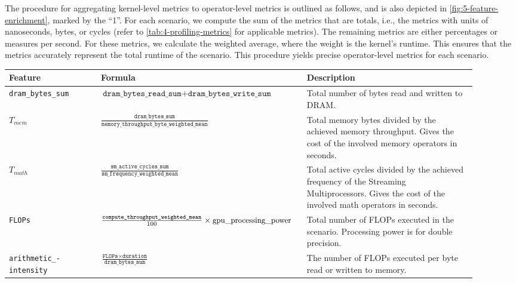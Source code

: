 The procedure for aggregating kernel-level metrics to operator-level metrics is outlined as follows, and is also depicted in \autoref{fig:5-feature-enrichment}, marked by the “1”. For each scenario, we compute the sum of the metrics that are totals, i.e., the metrics with units of nanoseconds, bytes, or cycles (refer to \autoref{tab:4-profiling-metrics} for applicable metrics). The remaining metrics are either percentages or measures per second. For these metrics, we calculate the weighted average, where the weight is the kernel’s runtime. This ensures that the metrics accurately represent the total runtime of the scenario. This procedure yields precise operator-level metrics for each scenario.

\begin{table}[ht]
    \centering
    \begin{tabular}{p{0.19\linewidth}p{0.37\linewidth}>{\footnotesize}p{0.35\linewidth}}
        \toprule
        Feature                                   & Formula                                                                                                 & Description                                                                                                                                       \\
        \midrule\midrule
        \texttt{dram\_bytes\_sum}                 & $\texttt{dram\_bytes\_read\_sum} + \texttt{dram\_bytes\_write\_sum}$                                    & Total number of bytes read and written to DRAM.                                                                                                   \\
        $T_{mem}$                                 & $\frac{\texttt{dram\_bytes\_sum}}{\texttt{memory\_throughput\_byte\_weighted\_mean}}$                   & Total memory bytes divided by the achieved memory throughput. Gives the cost of the involved memory operators in seconds.                         \\
        $T_{math}$                                & $\frac{\texttt{sm\_active\_cycles\_sum}}{\texttt{sm\_frequency\_weighted\_mean}}$                       & Total active cycles divided by the achieved frequency of the Streaming Multiprocessors. Gives the cost of the involved math operators in seconds. \\
        \texttt{FLOPs}                            & $\frac{\texttt{compute\_throughput\_weighted\_mean}}{100} \times \text{\small{gpu\_processing\_power}}$ & Total number of FLOPs executed in the scenario. Processing power is for double precision.                                                         \\
        \texttt{arithmetic\_-} \texttt{intensity} & $\frac{\texttt{FLOPs} \times \texttt{duration}}{\texttt{dram\_bytes\_sum}}$                             & The number of FLOPs executed per byte read or written to memory.                                                                                  \\


\end{tabular}
\end{table}
